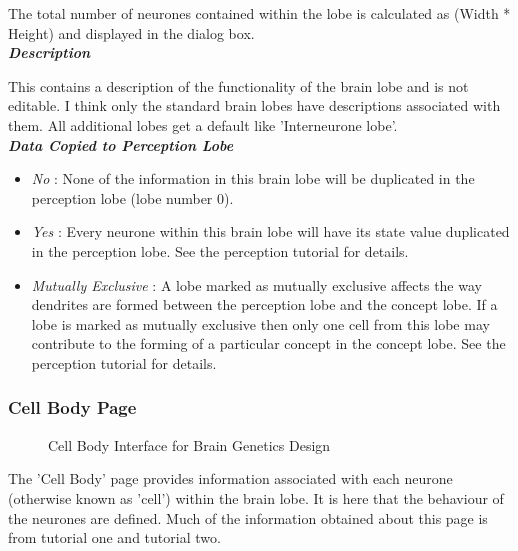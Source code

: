 \documentclass[11pt,twoside,a4paper]{article}
\begin{document}
The total number of neurones contained within the lobe is calculated as (Width * Height) and displayed in the dialog box.~\\ %

\textbf{\textit{Description}}

This contains a description of the functionality of the brain lobe and is not editable. I think only the standard brain lobes have descriptions associated with them. All additional lobes get a default like 'Interneurone lobe'.~\\

\textbf{\textit{Data Copied to Perception Lobe}}
\begin{itemize}
	\item[] \emph{No} : None of the information in this brain lobe will be duplicated in the perception lobe (lobe number 0).
	\item[] \emph{Yes} : Every neurone within this brain lobe will have its state value duplicated in the perception lobe. See the perception tutorial for details.
\item[] \textit{Mutually Exclusive} : A lobe marked as mutually exclusive affects the way dendrites are formed between the perception lobe and the concept lobe. If a lobe is marked as mutually exclusive then only one cell from this lobe may contribute to the forming of a particular concept in the concept lobe. See the perception tutorial for details. 
\end{itemize}

\subsubsection{Cell Body Page}

\begin{minipage}{0.4\linewidth}
\begin{figure}[H]
	\centerline {} %
	\caption{Cell Body Interface for Brain Genetics Design}
	\label{fig:brain_cellbody}
\end{figure}
\end{minipage}
\begin{minipage}{0.1\linewidth}\end{minipage}
\begin{minipage}{0.5\linewidth}
The 'Cell Body' page provides information associated with each neurone (otherwise known as 'cell') within the brain lobe. It is here that the behaviour of the neurones are defined. Much of the information obtained about this page is from tutorial one and tutorial two.
\end{minipage}~\\
\end{document}

